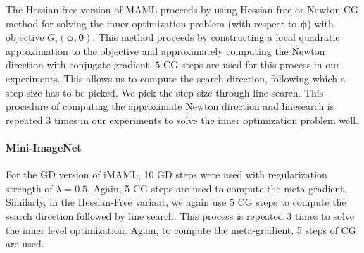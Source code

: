 \documentclass{article} \usepackage[nonatbib, final]{mod_neurips}
\newcommand{\param}{{\bm{\phi}}}               \newcommand{\paramspace}{\Phi}
\newcommand{\prior}{{\bm{\theta}}}               \newcommand{\priorspace}{\Theta}
\begin{document}
The Hessian-free version of MAML proceeds by using Hessian-free or Newton-CG method for solving the inner optimization problem (with respect to $\param$) with objective $G_i(\param, \prior)$. This method proceeds by constructing a local quadratic approximation to the objective and approximately computing the Newton direction with conjugate gradient. $5$ CG steps are used for this process in our experiments. This allows us to compute the search direction, following which a step size has to be picked. We pick the step size through line-search. This procedure of computing the approximate Newton direction and linesearch is repeated $3$ times in our experiments to solve the inner optimization problem well.

\paragraph{Mini-ImageNet}
For the GD version of iMAML, 10 GD steps were used with regularization strength of $\lambda=0.5$. Again, 5 CG steps are used to compute the meta-gradient. Similarly, in the Hessian-Free variant, we again use $5$ CG steps to compute the search direction followed by line search. This process is repeated $3$ times to solve the inner level optimization. Again, to compute the meta-gradient, 5 steps of CG are used.
\end{document}
